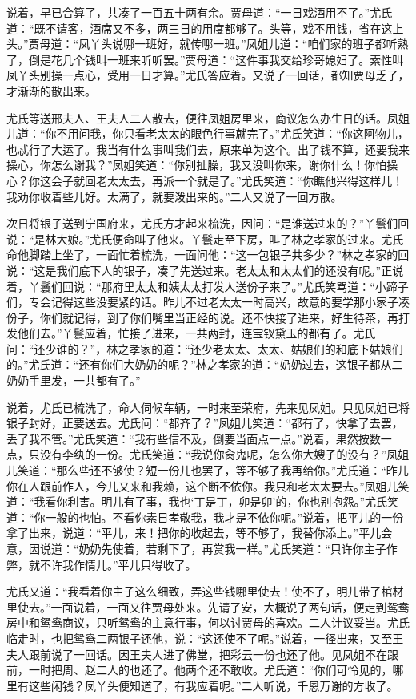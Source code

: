 \documentclass[12pt,oneside]{book}
\begin{document}
说着，早已合算了，共凑了一百五十两有余。贾母道：“一日戏酒用不了。”尤氏道：“既不请客，酒席又不多，两三日的用度都够了。头等，戏不用钱，省在这上头。”贾母道：“凤丫头说哪一班好，就传哪一班。”凤姐儿道：“咱们家的班子都听熟了，倒是花几个钱叫一班来听听罢。”贾母道：“这件事我交给珍哥媳妇了。索性叫凤丫头别操一点心，受用一日才算。”尤氏答应着。又说了一回话，都知贾母乏了，才渐渐的散出来。

尤氏等送邢夫人、王夫人二人散去，便往凤姐房里来，商议怎么办生日的话。凤姐儿道：“你不用问我，你只看老太太的眼色行事就完了。”尤氏笑道：“你这阿物儿，也忒行了大运了。我当有什么事叫我们去，原来单为这个。出了钱不算，还要我来操心，你怎么谢我？”凤姐笑道：“你别扯臊，我又没叫你来，谢你什么！你怕操心？你这会子就回老太太去，再派一个就是了。”尤氏笑道：“你瞧他兴得这样儿！我劝你收着些儿好。太满了，就要泼出来的。”二人又说了一回方散。

次日将银子送到宁国府来，尤氏方才起来梳洗，因问：“是谁送过来的？”丫鬟们回说：“是林大娘。”尤氏便命叫了他来。丫鬟走至下房，叫了林之孝家的过来。尤氏命他脚踏上坐了，一面忙着梳洗，一面问他：“这一包银子共多少？”林之孝家的回说：“这是我们底下人的银子，凑了先送过来。老太太和太太们的还没有呢。”正说着，丫鬟们回说：“那府里太太和姨太太打发人送份子来了。”尤氏笑骂道：“小蹄子们，专会记得这些没要紧的话。昨儿不过老太太一时高兴，故意的要学那小家子凑份子，你们就记得，到了你们嘴里当正经的说。还不快接了进来，好生待茶，再打发他们去。”丫鬟应着，忙接了进来，一共两封，连宝钗黛玉的都有了。尤氏问：“还少谁的？”，林之孝家的道：“还少老太太、太太、姑娘们的和底下姑娘们的。”尤氏道：“还有你们大奶奶的呢？”林之孝家的道：“奶奶过去，这银子都从二奶奶手里发，一共都有了。”

说着，尤氏已梳洗了，命人伺候车辆，一时来至荣府，先来见凤姐。只见凤姐已将银子封好，正要送去。尤氏问：“都齐了？”凤姐儿笑道：“都有了，快拿了去罢，丢了我不管。”尤氏笑道：“我有些信不及，倒要当面点一点。”说着，果然按数一点，只没有李纨的一份。尤氏笑道：“我说你肏鬼呢，怎么你大嫂子的没有？”凤姐儿笑道：“那么些还不够使？短一份儿也罢了，等不够了我再给你。”尤氏道：“昨儿你在人跟前作人，今儿又来和我赖，这个断不依你。我只和老太太要去。”凤姐儿笑道：“我看你利害。明儿有了事，我也‘丁是丁，卯是卯’的，你也别抱怨。”尤氏笑道：“你一般的也怕。不看你素日孝敬我，我才是不依你呢。”说着，把平儿的一份拿了出来，说道：“平儿，来！把你的收起去，等不够了，我替你添上。”平儿会意，因说道：“奶奶先使着，若剩下了，再赏我一样。”尤氏笑道：“只许你主子作弊，就不许我作情儿。”平儿只得收了。

尤氏又道：“我看着你主子这么细致，弄这些钱哪里使去！使不了，明儿带了棺材里使去。”一面说着，一面又往贾母处来。先请了安，大概说了两句话，便走到鸳鸯房中和鸳鸯商议，只听鸳鸯的主意行事，何以讨贾母的喜欢。二人计议妥当。尤氏临走时，也把鸳鸯二两银子还他，说：“这还使不了呢。”说着，一径出来，又至王夫人跟前说了一回话。因王夫人进了佛堂，把彩云一份也还了他。见凤姐不在跟前，一时把周、赵二人的也还了。他两个还不敢收。尤氏道：“你们可怜见的，哪里有这些闲钱？凤丫头便知道了，有我应着呢。”二人听说，千恩万谢的方收了。
\end{document}
